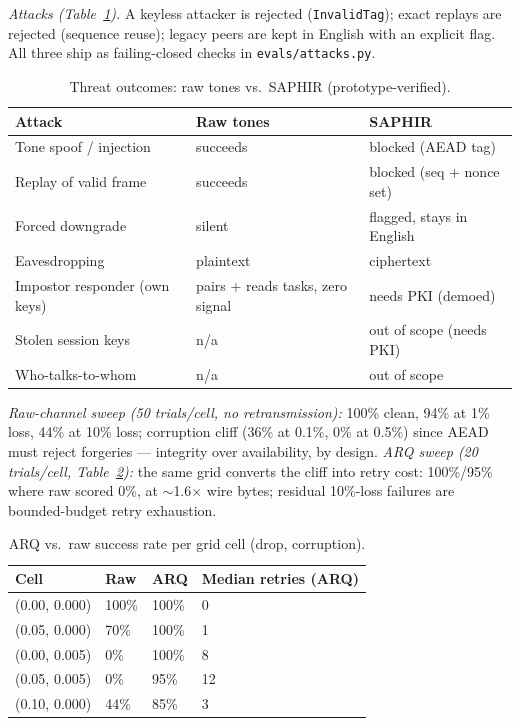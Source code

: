 \documentclass[11pt]{article}
\begin{document}
\emph{Attacks (Table~\ref{tab:threat}).} A keyless attacker is rejected
(\texttt{InvalidTag}); exact replays are rejected (sequence reuse); legacy
peers are kept in English with an explicit flag. All three ship as failing-closed
checks in \texttt{evals/attacks.py}.

\begin{table}[h]
\centering\small
\caption{Threat outcomes: raw tones vs.\ SAPHIR (prototype-verified).}
\label{tab:threat}
\begin{tabular}{@{}lll@{}}
\toprule
Attack & Raw tones & SAPHIR \\
\midrule
Tone spoof / injection & succeeds & blocked (AEAD tag) \\
Replay of valid frame & succeeds & blocked (seq + nonce set) \\
Forced downgrade & silent & flagged, stays in English \\
Eavesdropping & plaintext & ciphertext \\
Impostor responder (own keys) & pairs + reads tasks, zero signal & needs PKI (demoed) \\
Stolen session keys & n/a & out of scope (needs PKI) \\
Who-talks-to-whom & n/a & out of scope \\
\bottomrule
\end{tabular}
\end{table}

\emph{Raw-channel sweep (50 trials/cell, no retransmission):} 100\% clean,
94\% at 1\% loss, 44\% at 10\% loss; corruption cliff (36\% at 0.1\%,
0\% at 0.5\%) since AEAD must reject forgeries --- integrity over
availability, by design. \emph{ARQ sweep (20 trials/cell,
Table~\ref{tab:arq}):} the same grid converts the cliff into retry cost:
100\%/95\% where raw scored 0\%, at $\sim$1.6$\times$ wire bytes; residual
10\%-loss failures are bounded-budget retry exhaustion.

\begin{table}[h]
\centering\small
\caption{ARQ vs.\ raw success rate per grid cell (drop, corruption).}
\label{tab:arq}
\begin{tabular}{@{}llll@{}}
\toprule
Cell & Raw & ARQ & Median retries (ARQ) \\
\midrule
(0.00, 0.000) & 100\% & 100\% & 0 \\
(0.05, 0.000) & 70\% & 100\% & 1 \\
(0.00, 0.005) & 0\% & 100\% & 8 \\
(0.05, 0.005) & 0\% & 95\% & 12 \\
(0.10, 0.000) & 44\% & 85\% & 3 \\
\bottomrule
\end{tabular}
\end{table}
\end{document}
